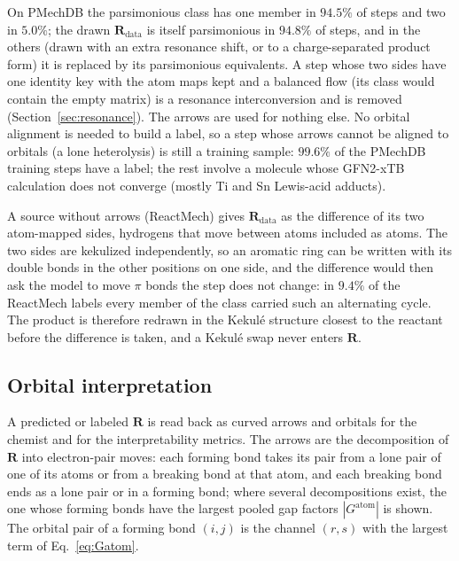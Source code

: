 \documentclass[11pt,a4paper]{article}
\newcommand{\vb}[1]{\bm{#1}}
\begin{document}
On PMechDB the parsimonious class has one member in $94.5\%$ of steps and two in $5.0\%$; the drawn $\vb{R}_{\mathrm{data}}$ is itself parsimonious in $94.8\%$ of steps, and in the others (drawn with an extra resonance shift, or to a charge-separated product form) it is replaced by its parsimonious equivalents. A step whose two sides have one identity key with the atom maps kept and a balanced flow (its class would contain the empty matrix) is a resonance interconversion and is removed (Section~\ref{sec:resonance}). The arrows are used for nothing else. No orbital alignment is needed to build a label, so a step whose arrows cannot be aligned to orbitals (a lone heterolysis) is still a training sample: $99.6\%$ of the PMechDB training steps have a label; the rest involve a molecule whose GFN2-xTB calculation does not converge (mostly Ti and Sn Lewis-acid adducts).

A source without arrows (ReactMech) gives $\vb{R}_{\mathrm{data}}$ as the difference of its two atom-mapped sides, hydrogens that move between atoms included as atoms. The two sides are kekulized independently, so an aromatic ring can be written with its double bonds in the other positions on one side, and the difference would then ask the model to move $\pi$ bonds the step does not change: in $9.4\%$ of the ReactMech labels every member of the class carried such an alternating cycle. The product is therefore redrawn in the Kekul\'e structure closest to the reactant before the difference is taken, and a Kekul\'e swap never enters $\vb{R}$.

\subsection{Orbital interpretation}
\label{sec:interpret}
A predicted or labeled $\vb{R}$ is read back as curved arrows and orbitals for the chemist and for the interpretability metrics. The arrows are the decomposition of $\vb{R}$ into electron-pair moves: each forming bond takes its pair from a lone pair of one of its atoms or from a breaking bond at that atom, and each breaking bond ends as a lone pair or in a forming bond; where several decompositions exist, the one whose forming bonds have the largest pooled gap factors $|G^{\mathrm{atom}}|$ is shown. The orbital pair of a forming bond $(i,j)$ is the channel $(r,s)$ with the largest term of Eq.~\eqref{eq:Gatom}.
\end{document}
